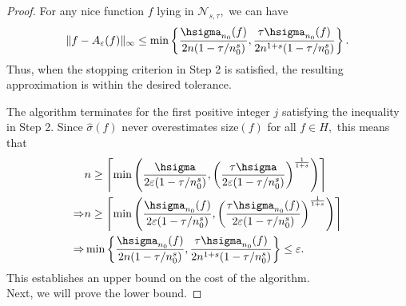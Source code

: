 \begin{proof}
For any nice function $f$ lying in $\mathcal{N}_{s,\tau},$ we can have
$$\|f-A_{\varepsilon}(f)\|_{\infty}\leq \min\left\{ \frac{\hsigma_{n_{0}}(f)}{2n(1 - \tau/n_{0}^{s})} , \frac{\tau\hsigma_{n_{0}}(f)}{2n^{1+s}(1 - \tau/n_{0}^{s})} \right\}.$$
Thus, when the stopping criterion in Step 2 is satisfied, the resulting approximation is within
the desired tolerance.

The algorithm terminates for the first positive integer $j$ satisfying the inequality in Step
2. Since $\hat{\sigma}(f)$ never overestimates size$(f)$ for all $f \in H,$ this means that
\begin{align*}
 & n \ge \left\lceil \min\left( \frac{\hsigma}{2\varepsilon(1 - \tau/n_{0}^{s})} , \left(\frac{\tau\hsigma}{2\varepsilon(1 - \tau/n_{0}^{s})}\right)^{\frac{1}{1+s}}\right) \right\rceil\\
   \Rightarrow & n \ge  \left\lceil \min\left( \frac{\hsigma_{n_{0}}(f)}{2\varepsilon(1 - \tau/n_{0}^{s})} , \left(\frac{\tau\hsigma_{n_{0}}(f)}{2\varepsilon(1 - \tau/n_{0}^{s})}\right)^{\frac{1}{1+s}}\right) \right\rceil\\
\Rightarrow &  \min\left\{ \frac{\hsigma_{n_{0}}(f)}{2n(1 - \tau/n_{0}^{s})} , \frac{\tau\hsigma_{n_{0}}(f)}{2n^{1+s}(1 - \tau/n_{0}^{s})} \right\}   \leq \varepsilon.
\end{align*}
This establishes an upper bound on the cost of the algorithm.\\

Next, we will prove the lower bound.


\end{proof}
